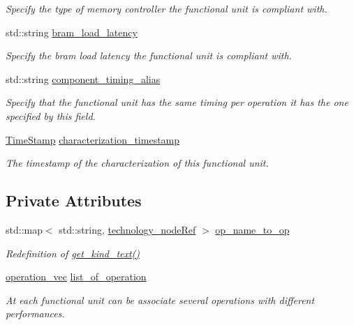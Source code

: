 \begin{DoxyCompactItemize}
\begin{DoxyCompactList}\small\item\em Specify the type of memory controller the functional unit is compliant with. \end{DoxyCompactList}\item 
std\+::string \hyperlink{structfunctional__unit_abcbfc67a4c3dfa44a24c2b6dbe783e39}{bram\+\_\+load\+\_\+latency}
\begin{DoxyCompactList}\small\item\em Specify the bram load latency the functional unit is compliant with. \end{DoxyCompactList}\item 
std\+::string \hyperlink{structfunctional__unit_ae02faad02a431ad46291ac13f8c4c593}{component\+\_\+timing\+\_\+alias}
\begin{DoxyCompactList}\small\item\em Specify that the functional unit has the same timing per operation it has the one specified by this field. \end{DoxyCompactList}\item 
\hyperlink{structTimeStamp}{Time\+Stamp} \hyperlink{structfunctional__unit_ab721a6dbc5f728621172d822d3589827}{characterization\+\_\+timestamp}
\begin{DoxyCompactList}\small\item\em The timestamp of the characterization of this functional unit. \end{DoxyCompactList}\end{DoxyCompactItemize}
\subsection*{Private Attributes}
\begin{DoxyCompactItemize}
\item 
std\+::map$<$ std\+::string, \hyperlink{technology__node_8hpp_a33dd193b7bd6b987bf0d8a770a819fa7}{technology\+\_\+node\+Ref} $>$ \hyperlink{structfunctional__unit_a57eafba98fafceb48f796b519aa75e52}{op\+\_\+name\+\_\+to\+\_\+op}
\begin{DoxyCompactList}\small\item\em Redefinition of \hyperlink{structtechnology__node_a4b8785a8d6c2db19e1bec0d3eef5c8f2}{get\+\_\+kind\+\_\+text()} \end{DoxyCompactList}\item 
\hyperlink{structfunctional__unit_a95afca234ddcc2e13d56d6e5eb53557a}{operation\+\_\+vec} \hyperlink{structfunctional__unit_a03e0801214eecf226f3a24d6e294dc8e}{list\+\_\+of\+\_\+operation}
\begin{DoxyCompactList}\small\item\em At each functional unit can be associate several operations with different performances. \end{DoxyCompactList}\end{DoxyCompactItemize}
